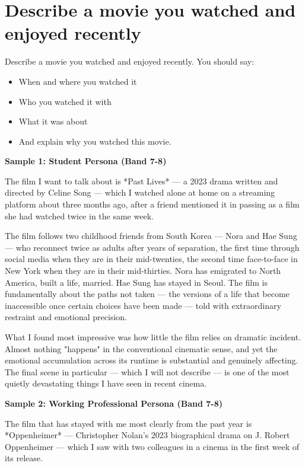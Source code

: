 \section{Describe a movie you watched and enjoyed recently}
\begin{ieltsprompt}
Describe a movie you watched and enjoyed recently.
You should say:
\begin{itemize}[leftmargin=2em, itemsep=2pt]
\item When and where you watched it
\item Who you watched it with
\item What it was about
\item And explain why you watched this movie.
\end{itemize}
\end{ieltsprompt}
\begin{ieltsanswer}
\textbf{Sample 1: Student Persona (Band 7-8)}

The film I want to talk about is *Past Lives* — a 2023 drama written and directed by Celine Song — which I watched alone at home on a streaming platform about three months ago, after a friend mentioned it in passing as a film she had watched twice in the same week.

The film follows two childhood friends from South Korea — Nora and Hae Sung — who reconnect twice as adults after years of separation, the first time through social media when they are in their mid-twenties, the second time face-to-face in New York when they are in their mid-thirties. Nora has emigrated to North America, built a life, married. Hae Sung has stayed in Seoul. The film is fundamentally about the paths not taken — the versions of a life that become inaccessible once certain choices have been made — told with extraordinary restraint and emotional precision.

What I found most impressive was how little the film relies on dramatic incident. Almost nothing "happens" in the conventional cinematic sense, and yet the emotional accumulation across its runtime is substantial and genuinely affecting. The final scene in particular — which I will not describe — is one of the most quietly devastating things I have seen in recent cinema.

\textbf{Sample 2: Working Professional Persona (Band 7-8)}

The film that has stayed with me most clearly from the past year is *Oppenheimer* — Christopher Nolan's 2023 biographical drama on J. Robert Oppenheimer — which I saw with two colleagues in a cinema in the first week of its release.


\end{ieltsanswer}
